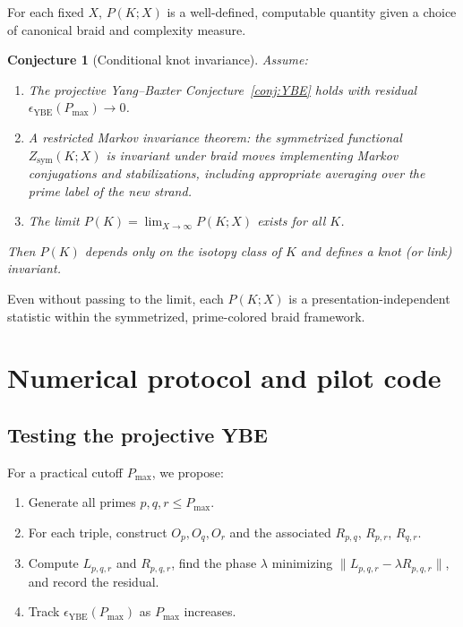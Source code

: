\documentclass[11pt]{article}
\newtheorem{conjecture}{Conjecture}
\begin{document}
For each fixed $X$, $P(K;X)$ is a well-defined, computable quantity given a choice of canonical braid and complexity measure.

\begin{conjecture}[Conditional knot invariance]
\label{conj:main}
Assume:
\begin{enumerate}[label=(\roman*),leftmargin=1.5em]
  \item The projective Yang--Baxter Conjecture~\ref{conj:YBE} holds with residual $\epsilon_{\mathrm{YBE}}(P_{\max})\to 0$.
  \item A restricted Markov invariance theorem: the symmetrized functional $Z_{\mathrm{sym}}(K;X)$ is invariant under braid moves implementing Markov conjugations and stabilizations, including appropriate averaging over the prime label of the new strand.
  \item The limit $P(K)=\lim_{X\to\infty}P(K;X)$ exists for all $K$.
\end{enumerate}
Then $P(K)$ depends only on the isotopy class of $K$ and defines a knot (or link) invariant.
\end{conjecture}

Even without passing to the limit, each $P(K;X)$ is a presentation-independent statistic within the symmetrized, prime-colored braid framework.

\section{Numerical protocol and pilot code}

\subsection{Testing the projective YBE}

For a practical cutoff $P_{\max}$, we propose:

\begin{enumerate}[leftmargin=1.5em]
  \item Generate all primes $p,q,r\le P_{\max}$.
  \item For each triple, construct $O_p,O_q,O_r$ and the associated $R_{p,q}$, $R_{p,r}$, $R_{q,r}$.
  \item Compute $L_{p,q,r}$ and $R_{p,q,r}$, find the phase $\lambda$ minimizing $\|L_{p,q,r}-\lambda R_{p,q,r}\|$, and record the residual.
  \item Track $\epsilon_{\mathrm{YBE}}(P_{\max})$ as $P_{\max}$ increases.
\end{enumerate}
\end{document}
